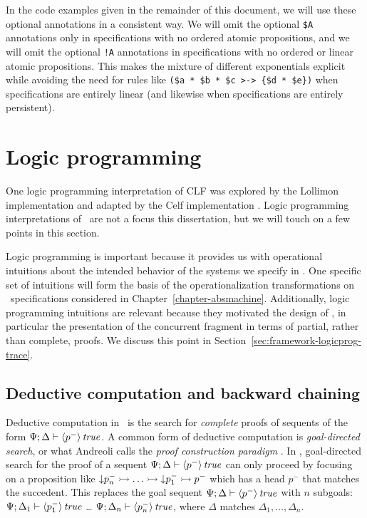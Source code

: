 In the code examples given in the remainder of this document, we will
use these optional annotations in a consistent way.  We will omit the
optional \verb|$A| annotations only in specifications with no ordered
atomic propositions, and we will omit the optional \verb|!A|
annotations in specifications with no ordered or linear atomic
propositions. This makes the mixture of different exponentials
explicit while avoiding the need for rules like
\verb|($a * $b * $c >-> {$d * $e})| when specifications are entirely
linear (and likewise when specifications are entirely persistent).

\section{Logic programming}
\label{sec:framework-logicprog}

One logic programming interpretation of CLF was explored by the
Lollimon implementation \cite{lopez05monadic} and adapted by the Celf
implementation
\cite{schacknielsen08celf,schacknielsen11implementing}. Logic
programming interpretations of \sls~are not a focus this dissertation, but
we will touch on a few points in this section.

Logic programming is important because it provides us with operational
intuitions about the intended behavior of the systems we specify in
\sls. One specific set of intuitions will form the basis of the
operationalization transformations on \sls~specifications considered
in Chapter~\ref{chapter-absmachine}. 
Additionally, logic programming intuitions are relevant
because they motivated the design of \sls, in particular the
presentation of the concurrent fragment in terms of partial, rather
than complete, proofs. We discuss this point in
Section~\ref{sec:framework-logicprog-trace}.

\subsection{Deductive computation and backward chaining}
\label{sec:framework-logicprog-deductive}
\label{sec:framework-modes}

Deductive computation in \sls~is the search for {\it complete} proofs
of sequents of the form ${\Psi};{\Delta} \vdash {{\langle {p^-} \rangle}\,{{\it true}}} \mathstrut$.  A
common form of deductive computation is {\it goal-directed search}, or
what Andreoli calls the {\it proof construction paradigm}
\cite{andreoli01focussing}.
In \sls, goal-directed search for the proof of a sequent
${\Psi};{\Delta} \vdash {{\langle {p^-} \rangle}\,{{\it true}}} \mathstrut$ can only proceed by focusing
on a proposition like ${\downarrow}p_n^- \rightarrowtail \ldots \rightarrowtail
{\downarrow}p_1^- \rightarrowtail p^-$ which has a head $p^-$ that matches the
succedent. This replaces the goal sequent
${\Psi};{\Delta} \vdash {{\langle {p^-} \rangle}\,{{\it true}}} \mathstrut$ with $n$ subgoals:
${\Psi};{\Delta_1} \vdash {{\langle {p_1^-} \rangle}\,{{\it true}}} \mathstrut$ \ldots
${\Psi};{\Delta_n} \vdash {{\langle {p_n^-} \rangle}\,{{\it true}}} \mathstrut$, where $\Delta$ matches
$\Delta_1,\ldots,\Delta_n$.

